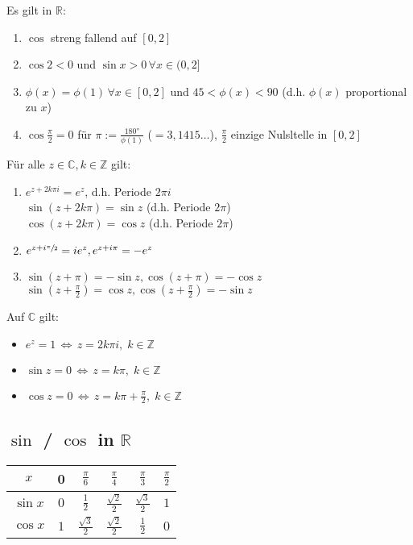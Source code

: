 \begin{lemma}
	Es gilt in $\mathbb{R}$:
	\begin{enumerate}[label={\arabic*)}]
		\item $\cos$ streng fallend auf $[0,2]$
		\item $\cos 2 < 0$ und $\sin x > 0\,\forall x\in (0,2]$
		\item $\phi(x) = \phi(1) \,\forall x\in [0,2]$ und $45 < \phi(x) < 90$ (d.h. $\phi(x)$ proportional zu $x$)
		\item $\cos \frac{\pi}{2} = 0$ für $\pi := \frac{180°}{\phi(1)}$ ($=3,1415\dotsc$), $\frac{\pi}{2}$ einzige Nulsltelle in $[0,2]$
	\end{enumerate}
\end{lemma}
\begin{proposition}
	Für alle $z\in\mathbb{C}, k\in\mathbb{Z}$ gilt:
	\begin{enumerate}[label={\arabic*)}]
		\item $e^{z+2k\pi i} = e^z$, d.h. Periode $2\pi i$\\
		$\sin(z+2k\pi) = \sin z$ (d.h. Periode $2\pi$)\\
		$\cos(z+2k\pi) = \cos z$ (d.h. Periode $2\pi$)
		\item $e^{z+i\sfrac{\pi}{2}} = ie^z, e^{z+i\pi} = -e^z$
		\item $\sin(z+\pi) = -\sin z, \cos(z+\pi) = -\cos z$\\
		$\sin\left(z+\frac{\pi}{2}\right) = \cos z, \cos\left(z+\frac{\pi}{2}\right) = -\sin z$
	\end{enumerate}
\end{proposition}

\begin{proposition}
	Auf $\mathbb{C}$ gilt:
	\begin{itemize}
		\item $e^z = 1 \,\Leftrightarrow\,z=2k\pi i,\;k\in\mathbb{Z}$
		\item $\sin z = 0\,\Leftrightarrow\,z=k\pi,\;k\in\mathbb{Z}$
		\item $\cos z = 0\,\Leftrightarrow\,z =k\pi + \frac{\pi}{2},\;k\in\mathbb{Z}$
	\end{itemize}
\end{proposition}
\subsection*{$\sin$ / $\cos$ in $\mathbb{R}$}
\begin{centering}
	\begin{tabular}{c|ccccc}
		\toprule
		$x$ & 0 & $\frac{\pi}{6}$ & $\frac{\pi}{4}$ & $\frac{\pi}{3}$ & $\frac{\pi}{2}$ \\
		\midrule
		$\sin x$ & $0$ & $\frac{1}{2}$ & $\frac{\sqrt{2}}{2}$ & $\frac{\sqrt{3}}{2}$ & $1$ \\
		$\cos x$ & $1$ & $\frac{\sqrt{3}}{2}$ & $\frac{\sqrt{2}}{2}$ & $\frac{1}{2}$ & $0$ \\
		\bottomrule
	\end{tabular}
\end{centering}

